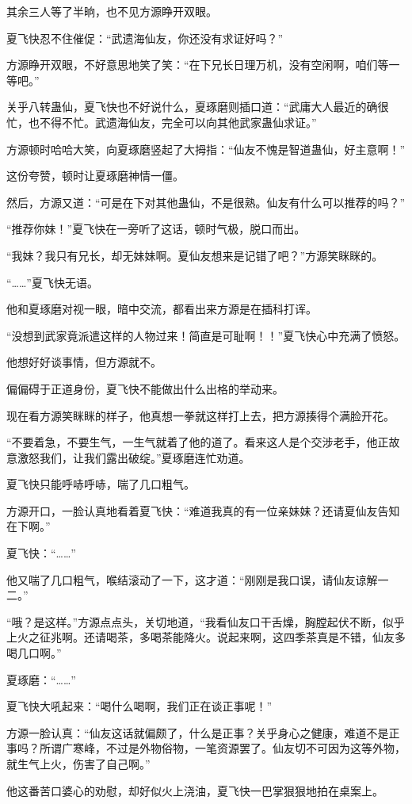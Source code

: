 \begin{this_body}
其余三人等了半晌，也不见方源睁开双眼。

夏飞快忍不住催促：“武遗海仙友，你还没有求证好吗？”

方源睁开双眼，不好意思地笑了笑：“在下兄长日理万机，没有空闲啊，咱们等一等吧。”

关乎八转蛊仙，夏飞快也不好说什么，夏琢磨则插口道：“武庸大人最近的确很忙，也不得不忙。武遗海仙友，完全可以向其他武家蛊仙求证。”

方源顿时哈哈大笑，向夏琢磨竖起了大拇指：“仙友不愧是智道蛊仙，好主意啊！”

这份夸赞，顿时让夏琢磨神情一僵。

然后，方源又道：“可是在下对其他蛊仙，不是很熟。仙友有什么可以推荐的吗？”

“推荐你妹！”夏飞快在一旁听了这话，顿时气极，脱口而出。

“我妹？我只有兄长，却无妹妹啊。夏仙友想来是记错了吧？”方源笑眯眯的。

“……”夏飞快无语。

他和夏琢磨对视一眼，暗中交流，都看出来方源是在插科打诨。

“没想到武家竟派遣这样的人物过来！简直是可耻啊！！”夏飞快心中充满了愤怒。

他想好好谈事情，但方源就不。

偏偏碍于正道身份，夏飞快不能做出什么出格的举动来。

现在看方源笑眯眯的样子，他真想一拳就这样打上去，把方源揍得个满脸开花。

“不要着急，不要生气，一生气就着了他的道了。看来这人是个交涉老手，他正故意激怒我们，让我们露出破绽。”夏琢磨连忙劝道。

夏飞快只能呼哧呼哧，喘了几口粗气。

方源开口，一脸认真地看着夏飞快：“难道我真的有一位亲妹妹？还请夏仙友告知在下啊。”

夏飞快：“……”

他又喘了几口粗气，喉结滚动了一下，这才道：“刚刚是我口误，请仙友谅解一二。”

“哦？是这样。”方源点点头，关切地道，“我看仙友口干舌燥，胸膛起伏不断，似乎上火之征兆啊。还请喝茶，多喝茶能降火。说起来啊，这四季茶真是不错，仙友多喝几口啊。”

夏琢磨：“……”

夏飞快大吼起来：“喝什么喝啊，我们正在谈正事呢！”

方源一脸认真：“仙友这话就偏颇了，什么是正事？关乎身心之健康，难道不是正事吗？所谓广寒峰，不过是外物俗物，一笔资源罢了。仙友切不可因为这等外物，就生气上火，伤害了自己啊。”

他这番苦口婆心的劝慰，却好似火上浇油，夏飞快一巴掌狠狠地拍在桌案上。


\end{this_body}
